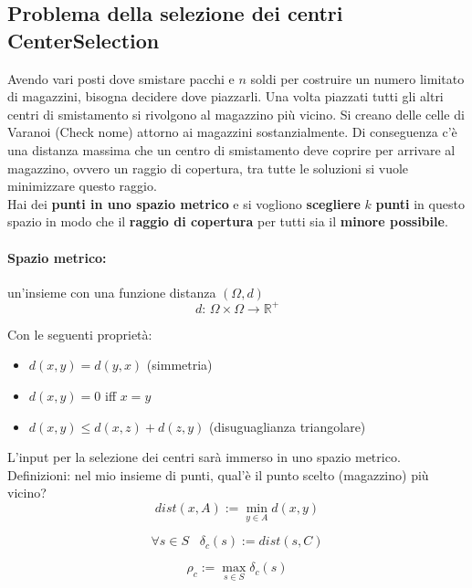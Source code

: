 \documentclass[11pt]{article}
\begin{document}
	\newpage
	
	\subsection{Problema della selezione dei centri CenterSelection}
	Avendo vari posti dove smistare pacchi e $n$ soldi per costruire un numero limitato di magazzini, bisogna decidere dove piazzarli. Una volta piazzati tutti gli altri centri di smistamento si rivolgono al magazzino più vicino. Si creano delle celle di Varanoi (Check nome) attorno ai magazzini sostanzialmente. Di conseguenza c'è una distanza massima che un centro di smistamento deve coprire per arrivare al magazzino, ovvero un raggio di copertura, tra tutte le soluzioni si vuole minimizzare questo raggio.\\
	
	Hai dei \textbf{punti in uno spazio metrico} e si vogliono \textbf{scegliere} $k$ \textbf{punti} in questo spazio in modo che il \textbf{raggio di copertura} per tutti sia il \textbf{minore possibile}.\\
	
	\paragraph{Spazio metrico:} un'insieme con una funzione distanza $(\Omega, d)$ 
	$$d: \, \Omega  \times \Omega \rightarrow \mathbb{R}^+$$
	
	Con le seguenti proprietà:
	\begin{itemize}
		\item $d(x,y) = d(y,x)$ (simmetria)
		\item $d(x,y) = 0$ iff $x=y$
		\item $d(x,y) \leq d(x,z) + d(z,y)$ (disuguaglianza triangolare)
	\end{itemize}
	L'input per la selezione dei centri sarà immerso in uno spazio metrico.\\
	
	Definizioni: nel mio insieme di punti, qual'è il punto scelto (magazzino) più vicino?
	$$ dist(x,A) := \min_{y \in A} d(x,y) $$
	
	$$ \forall s \in S \;\;\; \delta_c (s) := dist(s,C)$$
	
	$$ \rho_c := \max_{s \in S} \delta_c (s) $$
	
	\newpage
	
\end{document}

